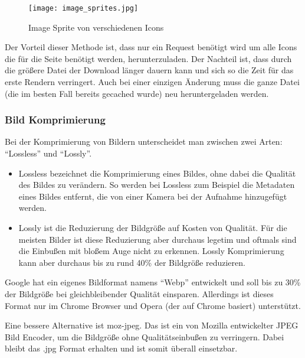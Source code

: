 			\begin{figure}[htbp]
				\begin{center}
					\texttt{[image: image\_sprites.jpg]}
					\caption{Image Sprite von verschiedenen Icons}
					\label{fig:image_sprites}
				\end{center}
			\end{figure}
			
			Der Vorteil dieser Methode ist, dass nur ein Request benötigt wird um alle Icons die für die Seite benötigt werden, herunterzuladen. Der Nachteil ist, dass durch die größere Datei der Download länger dauern kann und sich so die Zeit für das erste Rendern verringert. Auch bei einer einzigen Änderung muss die ganze Datei (die im besten Fall bereits gecached wurde) neu heruntergeladen werden.
			

		\subsubsection{Bild Komprimierung} %
		\label{ssub:bild_komprimierung}
			Bei der Komprimierung von Bildern unterscheidet man zwischen zwei Arten: "`Lossless"' und "`Lossly"'.
			\begin{itemize}
				\item Lossless bezeichnet die Komprimierung eines Bildes, ohne dabei die Qualität des Bildes zu verändern. So werden bei Lossless zum Beispiel die Metadaten eines Bildes entfernt, die von einer Kamera bei der Aufnahme hinzugefügt werden.
				\item Lossly ist die Reduzierung der Bildgröße auf Kosten von Qualität. Für die meisten Bilder ist diese Reduzierung aber durchaus legetim und oftmals sind die Einbußen mit bloßem Auge nicht zu erkennen. Lossly Komprimierung kann aber durchaus bis zu rund 40\% der Bildgröße reduzieren.
			\end{itemize}

			Google hat ein eigenes Bildformat namens "`Webp"' entwickelt und soll bis zu 30\% der Bildgröße bei gleichbleibender Qualität einsparen. Allerdings ist dieses Format nur im Chrome Browser und Opera (der auf Chrome basiert) unterstützt.\autocite{canIuse}

			Eine bessere Alternative ist moz-jpeg. Das ist ein von Mozilla entwickelter JPEG Bild Encoder, um die Bildgröße ohne Qualitätseinbußen zu verringern. Dabei bleibt das .jpg Format erhalten und ist somit überall einsetzbar.


